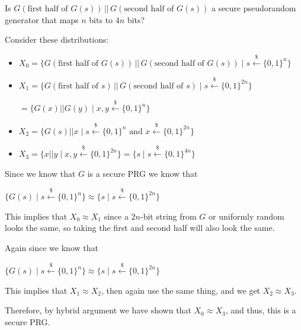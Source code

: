 \documentclass[12pt, letterpaper]{article}
\renewcommand{\t}[1]{\text{#1}}
\begin{document}
\begin{subproblem}{}
    Is $G(\t{first half of } G(s))\,||\,G(\t{second half of } G(s))$ a secure pseudorandom generator that
maps $n$ bits to $4n$ bits?
\end{subproblem}
\begin{problemproof}
    Consider these distributions:
    \begin{itemize}
        \item $X_0 = \{G(\t{first half of } G(s))\,||\,G(\t{second half of } G(s)) \mid s \overset{\$}{\leftarrow} \{0,1\}^n\}$
        \item $X_1 = \{G(\t{first half of } s)\,||\,G(\t{second half of } s) \mid s \overset{\$}{\leftarrow} \{0,1\}^{2n}\}$ 
                   
                   $= \{G(x) || G(y) \mid x,y \overset{\$}{\leftarrow} \{0,1\}^{n}\}$
        \item $X_2 = \{G(s) || x \mid s \overset{\$}{\leftarrow} \{0,1\}^{n} \t{ and } x \overset{\$}{\leftarrow} \{0,1\}^{2n}\}$
        \item $X_3 = \{x || y \mid x,y \overset{\$}{\leftarrow} \{0,1\}^{2n}\} =  \{s \mid s  \overset{\$}{\leftarrow} \{0,1\}^{4n}\}$
    \end{itemize}

    Since we know that $G$ is a secure PRG we know that 
    
    $\{G(s) \mid s \overset{\$}{\leftarrow} \{0,1\}^{n}\} \approx \{s \mid s \overset{\$}{\leftarrow} \{0,1\}^{2n}\}$

    This implies that $X_0 \approx X_1$ since a $2n$-bit string from $G$ or uniformly random looks the same, so taking the first and second half will also look the same.

    Again since we know that 

    $\{G(s) \mid s \overset{\$}{\leftarrow} \{0,1\}^{n}\} \approx \{s \mid s \overset{\$}{\leftarrow} \{0,1\}^{2n}\}$

    This implies that $X_1 \approx X_2$, then again use the same thing, and we get $X_2 \approx X_3$.

    Therefore, by hybrid argument we have shown that $X_0 \approx X_3$, and thus, this is a secure PRG.
\end{problemproof}
\end{document}
